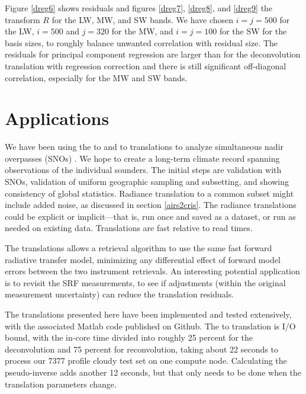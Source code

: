 \documentclass[journal]{IEEEtran}
\begin{document}
Figure \ref{dreg6} shows residuals and figures \ref{dreg7},
\ref{dreg8}, and \ref{dreg9} the transform $R$ for the {\cris} LW,
MW, and SW bands.  We have chosen $i = j = 500$ for the LW, $i =
500$ and $j = 320$ for the MW, and $i = j = 100$ for the SW for the
basis sizes, to roughly balance unwanted correlation with residual
size.  The residuals for principal component regression are larger
than for the deconvolution translation with regression correction
and there is still significant off-diagonal correlation, especially
for the MW and SW bands.

\section{Applications}  
\label{appcon}

We have been using the {\airs} to {\cris} and {\iasi} to {\cris}
translations to analyze simultaneous nadir overpasses (SNOs)
\cite{wang2015, sno1}.  We hope to create a long-term climate record
spanning observations of the individual sounders.  The initial steps
are validation with SNOs, validation of uniform geographic sampling
and subsetting, and showing consistency of global statistics.
Radiance translation to a common subset might include added noise,
as discussed in section \ref{airs2cris}.  The radiance translations
could be explicit or implicit---that is, run once and saved as a
dataset, or run as needed on existing data.  Translations are fast
relative to read times.

The translations allows a retrieval algorithm to use the same fast
forward radiative transfer model, minimizing any differential effect
of forward model errors between the two instrument retrievals.  
An interesting potential application is to revisit the {\airs} SRF
measurements, to see if adjustments (within the original measurement
uncertainty) can reduce the translation residuals.

The translations presented here have been implemented and tested
extensively, with the associated Matlab code published on Github.
The {\airs} to {\cris} translation is I/O bound, with the in-core
time divided into roughly 25 percent for the deconvolution and 75
percent for reconvolution, taking about 22 seconds to process our
7377 profile cloudy test set on one compute node.  Calculating the
pseudo-inverse adds another 12 seconds, but that only needs to be
done when the translation parameters change.
\end{document}
